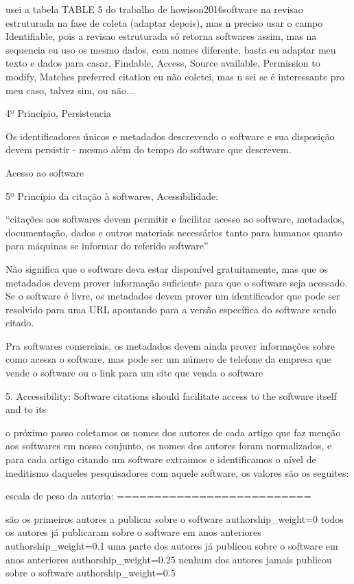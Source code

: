 usei a tabela TABLE 5 do trabalho de howison2016software na revisao estruturada
na fase de coleta (adaptar depois), mas n preciso usar o campo Identifiable, pois
a revisao estruturada só retorna softwares assim, mas na sequencia eu uso os
mesmo dados, com nomes diferente, basta eu adaptar meu texto e dados para casar,
Findable, Access, Source available, Permission to modify, Matches preferred citation eu
não coletei, mas n sei se é interessante pro meu caso, talvez sim, ou não...

4º Princípio, Persistencia

Os identificadores únicos e metadados descrevendo o software e sua disposição
devem persistir - mesmo além do tempo do software que descrevem.

Acesso ao software

5º Princípio da citação à softwares, Acessibilidade:

``citações aos softwares devem permitir e facilitar acesso ao software,
metadados, documentação, dados e outros materiais necessários tanto
para humanos quanto para máquinas se informar do referido software''

Não significa que o software deva estar disponível gratuitamente, mas que
os metadados devem prover informação suficiente para que o software seja
acessado. Se o software é livre, os metadados devem prover um identificador
que pode ser resolvido para uma URL apontando para a versão específica
do software sendo citado.

Pra softwares comerciais, os metadados devem ainda prover informações sobre
como acessa o software, mas pode ser um número de telefone da empresa que
vende o software ou o link para um site que venda o software

\cite{smith2016software}

5. Accessibility: Software citations should facilitate access to the software itself and to its


o próximo passo coletamos os nomes dos autores de cada artigo que faz menção
aos softwares em nosso conjunto, os nomes dos autores foram normalizados,
e para cada artigo citando um software extraimos e identificamos o nível
de ineditismo daqueles pesquisadores com aquele software, os valores
são os seguites:

escala de peso da autoria:
==========================

são os primeiros autores a publicar sobre o software
  authorship\_weight=0
todos os autores já publicaram sobre o software em anos anteriores
  authorship\_weight=0.1
uma parte dos autores já publicou sobre o software em anos anteriores
  authorship\_weight=0.25
nenhum dos autores jamais publicou sobre o software
  authorship\_weight=0.5



